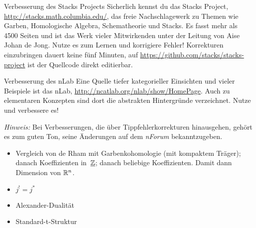 \documentclass{uebblatt}
\begin{document}

\begin{aufgabe}{Verbesserung des Stacks Projects}
Sicherlich kennst du das Stacks Project,
\url{http://stacks.math.columbia.edu/}, das freie Nachschlagewerk zu Themen wie
Garben, Homologische Algebra, Schematheorie und Stacks. Es fasst mehr als 4500
Seiten und ist das Werk vieler Mitwirkenden unter der Leitung von Aise Johan de
Jong. Nutze es zum Lernen und korrigiere Fehler! Korrekturen einzubringen
dauert keine fünf Minuten, auf \url{https://github.com/stacks/stacks-project}
ist der Quellcode direkt editierbar.
\end{aufgabe}

\begin{aufgabe}{Verbesserung des nLab}
Eine Quelle tiefer kategorieller Einsichten und vieler Beispiele ist das nLab,
\url{http://ncatlab.org/nlab/show/HomePage}. Auch zu elementaren Konzepten sind
dort die abstrakten Hintergründe verzeichnet. Nutze und verbessere es!

{\tiny\emph{Hinweis:} Bei Verbesserungen, die über Tippfehlerkorrekturen
hinausgehen, gehört es zum guten Ton, seine Änderungen auf dem \emph{nForum}
bekanntzugeben.\par}
\end{aufgabe}

\begin{itemize}
\item Vergleich von de Rham mit Garbenkohomologie (mit kompaktem Träger);
danach Koeffizienten in~$\underline{\mathbb{Z}}$; danach beliebige Koeffizienten. Damit dann
Dimension von $\mathbb{R}^n$.
\item $j^! = j^*$
\item Alexander-Dualität
\item Standard-t-Struktur
\end{itemize}
\end{document}
